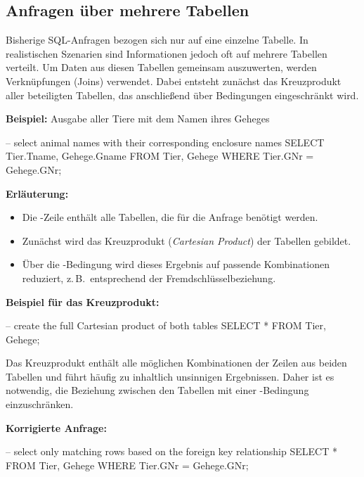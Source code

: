 \subsection{Anfragen über mehrere Tabellen}

    Bisherige SQL-Anfragen bezogen sich nur auf eine einzelne Tabelle.  
    In realistischen Szenarien sind Informationen jedoch oft auf mehrere Tabellen verteilt.  
    Um Daten aus diesen Tabellen gemeinsam auszuwerten, werden Verknüpfungen (Joins) verwendet.  
    Dabei entsteht zunächst das Kreuzprodukt aller beteiligten Tabellen, das anschließend über Bedingungen
    eingeschränkt wird.

    \textbf{Beispiel:} Ausgabe aller Tiere mit dem Namen ihres Geheges
    \begin{sql}
    -- select animal names with their corresponding enclosure names
    SELECT Tier.Tname, Gehege.Gname
        FROM Tier, Gehege
        WHERE Tier.GNr = Gehege.GNr;
    \end{sql}

    \textbf{Erläuterung:}
    \begin{itemize}
        \item Die -Zeile enthält alle Tabellen, die für die Anfrage benötigt werden.
        \item Zunächst wird das Kreuzprodukt (\textit{Cartesian Product}) der Tabellen gebildet.
        \item Über die -Bedingung wird dieses Ergebnis auf passende Kombinationen reduziert,
            z.\,B.\ entsprechend der Fremdschlüsselbeziehung.
    \end{itemize}

    \textbf{Beispiel für das Kreuzprodukt:}
    \begin{sql}
    -- create the full Cartesian product of both tables
    SELECT *
        FROM Tier, Gehege;
    \end{sql}

    \begin{tcolorbox}[gray={Hinweis zum Kreuzprodukt}]
    Das Kreuzprodukt enthält alle möglichen Kombinationen der Zeilen aus beiden Tabellen
    und führt häufig zu inhaltlich unsinnigen Ergebnissen.  
    Daher ist es notwendig, die Beziehung zwischen den Tabellen mit einer -Bedingung
    einzuschränken.
    \end{tcolorbox}

    \textbf{Korrigierte Anfrage:}
    \begin{sql}
    -- select only matching rows based on the foreign key relationship
    SELECT *
        FROM Tier, Gehege
        WHERE Tier.GNr = Gehege.GNr;
    \end{sql}

